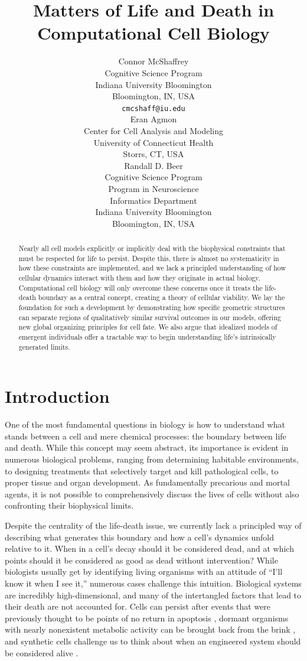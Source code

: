\documentclass{article}
\title{Matters of Life and Death in Computational Cell Biology}
\author{
 Connor McShaffrey \\
  Cognitive Science Program\\
  Indiana University Bloomington\\
  Bloomington, IN, USA \\
  \texttt{cmcshaff@iu.edu} \\
   \And
 Eran Agmon \\
  Center for Cell Analysis and Modeling\\
  University of Connecticut Health\\
  Storrs, CT, USA \\
  \And
 Randall D. Beer \\
  Cognitive Science Program\\
  Program in Neuroscience \\
  Informatics Department \\
  Indiana University Bloomington\\
  Bloomington, IN, USA \\
}
\begin{document}
\maketitle
\begin{abstract}
Nearly all cell models explicitly or implicitly deal with the biophysical constraints that must be respected for life to persist. Despite this, there is almost no systematicity in how these constraints are implemented, and we lack a principled understanding of how cellular dynamics interact with them and how they originate in actual biology. Computational cell biology will only overcome these concerns once it treats the life-death boundary as a central concept, creating a theory of cellular viability. We lay the foundation for such a development by demonstrating how specific geometric structures can separate regions of qualitatively similar survival outcomes in our models, offering new global organizing principles for cell fate. We also argue that idealized models of emergent individuals offer a tractable way to begin understanding life’s intrinsically generated limits. 
\end{abstract}




\section{Introduction}
One of the most fundamental questions in biology is how to understand what stands between a cell and mere chemical processes: the boundary between life and death. While this concept may seem abstract, its importance is evident in numerous biological problems, ranging from determining habitable environments, to designing treatments that selectively target and kill pathological cells, to proper tissue and organ development. As fundamentally precarious and mortal agents, it is not possible to comprehensively discuss the lives of cells without also confronting their biophysical limits.

Despite the centrality of the life-death issue, we currently lack a principled way of describing what generates this boundary and how a cell’s dynamics unfold relative to it. When in a cell’s decay should it be considered dead, and at which points should it be considered as good as dead without intervention? While biologists usually get by identifying living organisms with an attitude of “I’ll know it when I see it,” numerous cases challenge this intuition. Biological systems are incredibly high-dimensional, and many of the intertangled factors that lead to their death are not accounted for. Cells can persist after events that were previously thought to be points of no return in apoptosis \cite{spencer_measuring_2011, bock_mitochondria_2020}, dormant organisms with nearly nonexistent metabolic activity can be brought back from the brink \cite{lennon_microbial_2011}, and synthetic cells challenge us to think about when an engineered system should be considered alive \cite{elowitz_build_2010}. 
\end{document}
